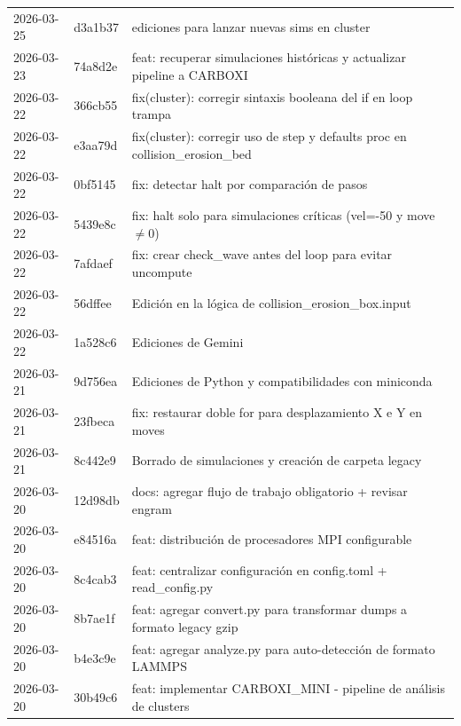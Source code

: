\documentclass[12pt,a4paper]{article}
\begin{document}
\begin{longtable}{@{}llp{10cm}@{}}
	2026-03-25     & d3a1b37         & ediciones para lanzar nuevas sims en cluster                                         \\
	2026-03-23     & 74a8d2e         & feat: recuperar simulaciones históricas y actualizar pipeline a CARBOXI              \\
	2026-03-22     & 366cb55         & fix(cluster): corregir sintaxis booleana del if en loop trampa                       \\
	2026-03-22     & e3aa79d         & fix(cluster): corregir uso de step y defaults proc en collision\_erosion\_bed        \\
	2026-03-22     & 0bf5145         & fix: detectar halt por comparación de pasos                                          \\
	2026-03-22     & 5439e8c         & fix: halt solo para simulaciones críticas (vel=-50 y move$\neq$0)                    \\
	2026-03-22     & 7afdaef         & fix: crear check\_wave antes del loop para evitar uncompute                          \\
	2026-03-22     & 56dffee         & Edición en la lógica de collision\_erosion\_box.input                                \\
	2026-03-22     & 1a528c6         & Ediciones de Gemini                                                                  \\
	2026-03-21     & 9d756ea         & Ediciones de Python y compatibilidades con miniconda                                 \\
	2026-03-21     & 23fbeca         & fix: restaurar doble for para desplazamiento X e Y en moves                          \\
	2026-03-21     & 8c442e9         & Borrado de simulaciones y creación de carpeta legacy                                 \\
	2026-03-20     & 12d98db         & docs: agregar flujo de trabajo obligatorio + revisar engram                          \\
	2026-03-20     & e84516a         & feat: distribución de procesadores MPI configurable                                  \\
	2026-03-20     & 8c4cab3         & feat: centralizar configuración en config.toml + read\_config.py                     \\
	2026-03-20     & 8b7ae1f         & feat: agregar convert.py para transformar dumps a formato legacy gzip                \\
	2026-03-20     & b4e3c9e         & feat: agregar analyze.py para auto-detección de formato LAMMPS                       \\
	2026-03-20     & 30b49c6         & feat: implementar CARBOXI\_MINI - pipeline de análisis de clusters                   \\
	\bottomrule
\end{longtable}
\end{document}
